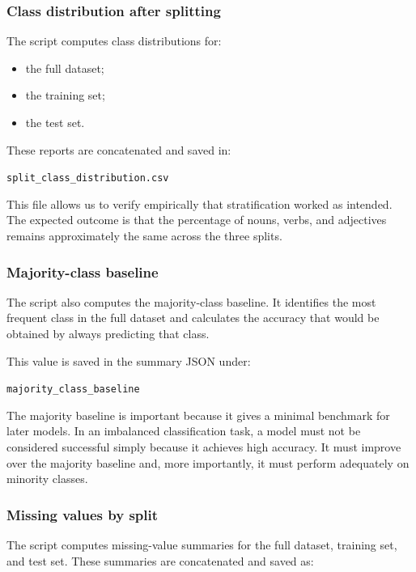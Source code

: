 \documentclass{ipgpmaster}
\begin{document}
\subsubsection{Class distribution after splitting}

The script computes class distributions for:

\begin{itemize}
    \item the full dataset;
    \item the training set;
    \item the test set.
\end{itemize}

These reports are concatenated and saved in:

\begin{center}
\texttt{split\_class\_distribution.csv}
\end{center}

This file allows us to verify empirically that stratification worked as intended. The expected outcome is that the percentage of nouns, verbs, and adjectives remains approximately the same across the three splits.

\subsubsection{Majority-class baseline}

The script also computes the majority-class baseline. It identifies the most frequent class in the full dataset and calculates the accuracy that would be obtained by always predicting that class.

This value is saved in the summary JSON under:

\begin{center}
\texttt{majority\_class\_baseline}
\end{center}

The majority baseline is important because it gives a minimal benchmark for later models. In an imbalanced classification task, a model must not be considered successful simply because it achieves high accuracy. It must improve over the majority baseline and, more importantly, it must perform adequately on minority classes.

\subsubsection{Missing values by split}

The script computes missing-value summaries for the full dataset, training set, and test set. These summaries are concatenated and saved as:
\end{document}
